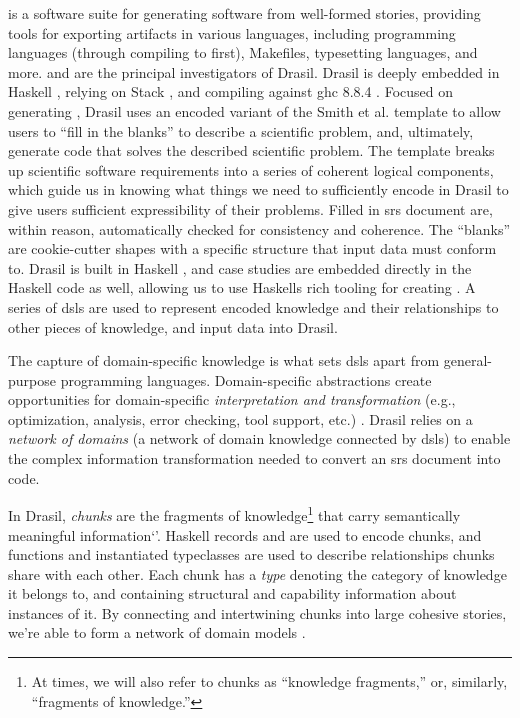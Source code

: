  is a software suite
for generating software from well-formed stories, providing tools for exporting
artifacts in various languages, including programming languages (through
compiling to  \cite{Carette2019} first), Makefiles, typesetting
languages, and more.  and  are the principal investigators of
Drasil. Drasil is deeply embedded in Haskell \cite{Haskell2010}, relying on
Stack \cite{HaskellStack}, and compiling against \acs{ghc} 8.8.4 \cite{GHC884}.
Focused on generating , Drasil uses an encoded variant of the Smith et
al. \cite{SmithAndLai2005}  template to allow users to ``fill in the
blanks'' to describe a scientific problem, and, ultimately, generate code that
solves the described scientific problem. The template breaks up scientific
software requirements into a series of coherent logical components, which guide
us in knowing what things we need to sufficiently encode in Drasil to give users
sufficient expressibility of their problems. Filled in \acs{srs} document are,
within reason, automatically checked for consistency and coherence. The
``blanks'' are cookie-cutter shapes with a specific structure that input data
must conform to. Drasil is built in Haskell \cite{Haskell2010}, and case studies
are embedded directly in the Haskell code as well, allowing us to use Haskells
rich tooling for creating . A series of \acsp{dsl} are used to
represent encoded knowledge and their relationships to other pieces of
knowledge, and input data into Drasil.

The capture of domain-specific knowledge is what sets \acsp{dsl} apart from
general-purpose programming languages. Domain-specific abstractions create
opportunities for domain-specific \textit{interpretation and transformation}
(e.g., optimization, analysis, error checking, tool support, etc.)
\cite{Czarnecki2005}. Drasil relies on a \textit{network of domains} (a network
of domain knowledge connected by \aclp{dsl}) to enable the complex information
transformation needed to convert an \acs{srs} document into code.

In Drasil, \textit{chunks} are the fragments of knowledge\footnote{At times, we
      will also refer to chunks as ``knowledge fragments,'' or, similarly, ``fragments
      of knowledge.''} that carry semantically meaningful information`'. Haskell
records and  are used to encode chunks, and functions and instantiated
typeclasses are used to describe relationships chunks share with each other.
Each chunk has a \textit{type} denoting the category of knowledge it belongs to,
and containing structural and capability information about instances of it. By
connecting and intertwining chunks into large cohesive stories, we're able to
form a network of domain models \cite{Czarnecki2005}.

